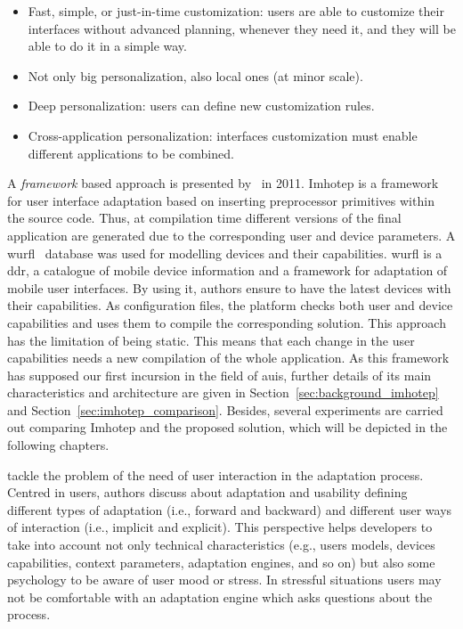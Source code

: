 \begin{itemize}
  \item Fast, simple, or just-in-time customization: users are able to customize
  their interfaces without advanced planning, whenever they need it, and they will
  be able to do it in a simple way.
  \item Not only big personalization, also local ones (at minor scale).
  \item Deep personalization: users can define new customization rules.
  \item Cross-application personalization: interfaces customization must enable 
  different applications to be combined.
\end{itemize}

A \textit{framework} based approach is presented by~\citet{almeida_imhotep_2011}
in 2011. Imhotep is a framework for user interface adaptation based on inserting
preprocessor primitives within the source code. Thus, at compilation time
different versions of the final application are generated due to the corresponding
user and device parameters. A \ac{wurfl}~\citep{wurfl} 
database was used for modelling devices and their capabilities. \ac{wurfl} is a 
\ac{ddr}, a catalogue of mobile device information and a framework for adaptation 
of mobile user interfaces. By using it, authors ensure to have the latest devices 
with their capabilities. As configuration files, the platform checks both user 
and device capabilities and uses them to compile the corresponding solution. This 
approach has the limitation of being static. This means that each change in the 
user capabilities needs a new compilation of the whole application. As this
framework has supposed our first incursion in the field of \acp{aui}, further
details of its main characteristics and architecture are given in Section~\ref{sec:background_imhotep}
and Section~\ref{sec:imhotep_comparison}. Besides, several experiments are
carried out comparing Imhotep and the proposed solution, which will be depicted
in the following chapters.

\citet{evers_achieving_2012} tackle the problem of the need of user interaction 
in the adaptation process. Centred in users, authors discuss about adaptation 
and usability defining different types of adaptation (i.e., forward and backward) 
and different user ways of interaction (i.e., implicit and explicit). This 
perspective helps developers to take into account not only technical 
characteristics (e.g., users models, devices capabilities, context parameters, 
adaptation engines, and so on) but also some psychology to be aware of user mood 
or stress. In stressful situations users may not be comfortable with an adaptation 
engine which asks questions about the process.

